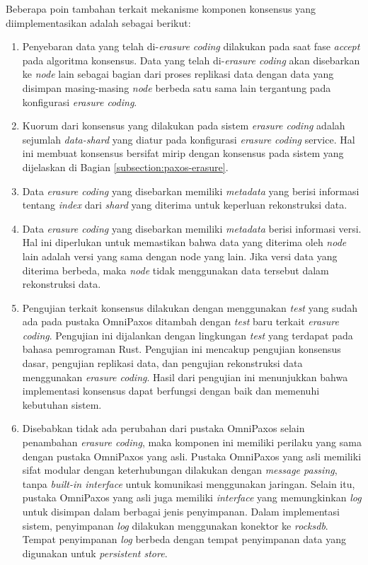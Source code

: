 Beberapa poin tambahan terkait mekanisme komponen konsensus yang diimplementasikan adalah sebagai berikut:
\begin{enumerate}
  \item Penyebaran data yang telah di-\textit{erasure coding} dilakukan pada saat fase \textit{accept} pada algoritma konsensus. Data yang telah di-\textit{erasure coding} akan disebarkan ke \textit{node} lain sebagai bagian dari proses replikasi data dengan data yang disimpan masing-masing \textit{node} berbeda satu sama lain tergantung pada konfigurasi \textit{erasure coding}.
  \item Kuorum dari konsensus yang dilakukan pada sistem \textit{erasure coding} adalah sejumlah \textit{data-shard} yang diatur pada konfigurasi \textit{erasure coding} service. Hal ini membuat konsensus bersifat mirip dengan konsensus pada sistem yang dijelaskan di Bagian \ref{subsection:paxos-erasure}.
  \item Data \textit{erasure coding} yang disebarkan memiliki \textit{metadata} yang berisi informasi tentang \textit{index} dari \textit{shard} yang diterima untuk keperluan rekonstruksi data.
  \item Data \textit{erasure coding} yang disebarkan memiliki \textit{metadata} berisi informasi versi. Hal ini diperlukan untuk memastikan bahwa data yang diterima oleh \textit{node} lain adalah versi yang sama dengan node yang lain. Jika versi data yang diterima berbeda, maka \textit{node} tidak menggunakan data tersebut dalam rekonstruksi data.
  \item Pengujian terkait konsensus dilakukan dengan menggunakan \textit{test} yang sudah ada pada pustaka OmniPaxos ditambah dengan \textit{test} baru terkait \textit{erasure coding}. Pengujian ini dijalankan dengan lingkungan \textit{test} yang terdapat pada bahasa pemrograman Rust. Pengujian ini mencakup pengujian konsensus dasar, pengujian replikasi data, dan pengujian rekonstruksi data menggunakan \textit{erasure coding}. Hasil dari pengujian ini menunjukkan bahwa implementasi konsensus dapat berfungsi dengan baik dan memenuhi kebutuhan sistem.
  \item Disebabkan tidak ada perubahan dari pustaka OmniPaxos selain penambahan \textit{erasure coding}, maka komponen ini memiliki perilaku yang sama dengan pustaka OmniPaxos yang asli. Pustaka OmniPaxos yang asli memiliki sifat modular dengan keterhubungan dilakukan dengan \textit{message passing}, tanpa \textit{built-in interface} untuk komunikasi menggunakan jaringan. Selain itu, pustaka OmniPaxos yang asli juga memiliki \textit{interface} yang memungkinkan \textit{log} untuk disimpan dalam berbagai jenis penyimpanan. Dalam implementasi sistem, penyimpanan \textit{log} dilakukan menggunakan konektor ke \textit{rocksdb}. Tempat penyimpanan \textit{log} berbeda dengan tempat penyimpanan data yang digunakan untuk \textit{persistent store}.
\end{enumerate}

